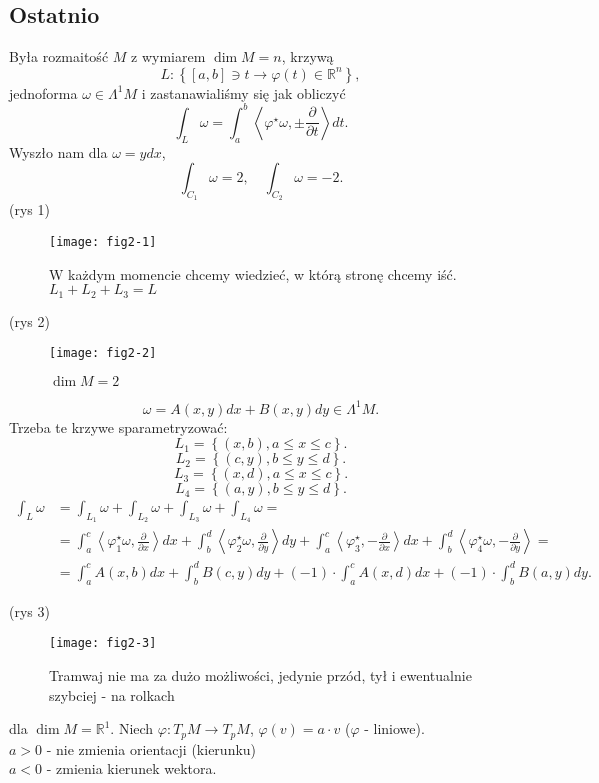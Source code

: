 \documentclass[../main.tex]{subfiles}
\begin{document}
    \subsection{Ostatnio}
    Była rozmaitość $M$ z wymiarem $\dim M = n$, krzywą
    \[
        L : \left\{ [a,b]\ni t \to \varphi(t)\in \mathbb{R}^n \right\}
    ,\]
jednoforma $\omega \in \Lambda^1M$ i zastanawialiśmy się jak obliczyć
\[
\int_L\omega = \int_a^b\left<\varphi^\star \omega, \pm\frac{\partial }{\partial t}  \right>dt
.\]
Wyszło nam dla $\omega = ydx$,
 \[
\int_{C_1}\omega = 2,\quad \int_{C_2}\omega = -2
.\]
(rys 1)
\begin{figure}[h]
    \centering
    \texttt{[image: fig2-1]}
    \caption{W każdym momencie chcemy wiedzieć, w którą stronę chcemy iść. $L_1 + L_2 + L_3 = L$}
    \label{fig:fig2-1}
\end{figure}
\begin{przyklad}
    (rys 2)
    \begin{figure}[h]
        \centering
        \texttt{[image: fig2-2]}
        \caption{$\dim M = 2$}
        \label{fig:fig2-2}
    \end{figure}
    \[
        \omega = A(x,y)dx + B(x,y)dy\in \Lambda^1M
    .\]
Trzeba te krzywe sparametryzować:
\[
    L_1 = \left\{ (x,b), a \le x \le c \right\}
.\]
\[
    L_2 = \left\{ (c,y), b \le y \le d \right\}
.\]
\[
    L_3 = \left\{ (x,d), a \le x \le c \right\}
.\]
\[
    L_4 = \left\{ (a,y), b \le y \le d \right\}
.\]
\begin{align*}
    \int_L\omega &= \int_{L_1}\omega + \int_{L_2}\omega + \int_{L_3}\omega + \int_{L_4}\omega =\\
    &= \int_a^c\left<\varphi_1^\star\omega, \frac{\partial }{\partial x}  \right>dx + \int_b^d\left<\varphi_2^\star \omega, \frac{\partial }{\partial y}  \right>dy + \int_a^c\left<\varphi^\star_3, -\frac{\partial }{\partial x}  \right>dx + \int_b^d\left<\varphi_4^\star \omega, -\frac{\partial }{\partial y}  \right> =\\
    &= \int_a^c A(x,b)dx + \int_b^d B(c,y)dy + (-1)\cdot \int_a^cA(x,d)dx + (-1)\cdot \int_b^dB(a,y)dy
.\end{align*}
\end{przyklad}
(rys 3)\\
\begin{figure}[h]
    \centering
    \texttt{[image: fig2-3]}
    \caption{Tramwaj nie ma za dużo możliwości, jedynie przód, tył i ewentualnie szybciej - na rolkach}
    \label{fig:fig2-3}
\end{figure}
dla $\dim M = \mathbb{R}^1$. Niech $\varphi : T_pM \to T_pM$, $\varphi(v) = a\cdot v$ ($\varphi$ - liniowe).\\
$a > 0$ - nie zmienia orientacji (kierunku)\\
$a < 0$ - zmienia kierunek wektora.
\end{document}
